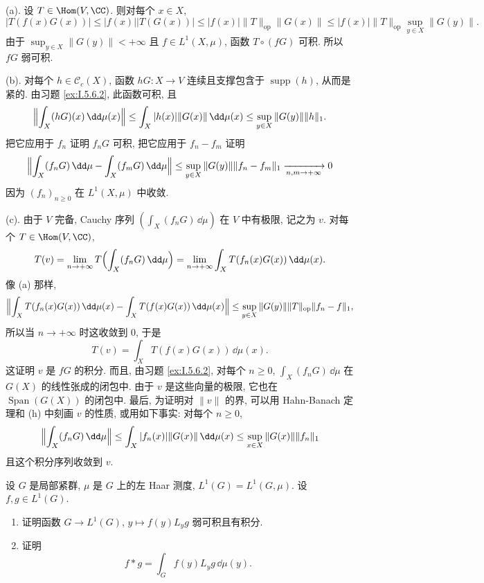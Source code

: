 \begin{solution}
(a). 设 $T \in \Hom(V, \CC)$. 则对每个 $x \in X$,
\[
|T(f(x)G(x))| \leq |f(x)||T(G(x))| \leq |f(x)|\|T\|_{\mathrm{op}}\|G(x)\| \leq |f(x)|\|T\|_{\mathrm{op}}\sup_{y \in X}\|G(y)\|.
\]
由于 $\sup_{y \in X}\|G(y)\| < +\infty$ 且 $f \in L^1(X, \mu)$, 函数 $T \circ (fG)$ 可积. 所以 $fG$ 弱可积.

(b). 对每个 $h \in \mathcal{C}_c(X)$, 函数 $hG \colon X \to V$ 连续且支撑包含于 $\operatorname{supp}(h)$, 从而是紧的. 由习题 \ref{ex:I.5.6.2}, 此函数可积, 且
\[
\Bigl\|\int_X (hG)(x)\,\dd\mu(x)\Bigr\| \leq \int_X |h(x)|\|G(x)\|\,\dd\mu(x) \leq \sup_{y \in X}\|G(y)\|\|h\|_1.
\]
把它应用于 $f_n$ 证明 $f_nG$ 可积, 把它应用于 $f_n - f_m$ 证明
\[
\Bigl\|\int_X (f_nG)\,\dd\mu - \int_X (f_mG)\,\dd\mu\Bigr\| \leq \sup_{y \in X}\|G(y)\|\|f_n - f_m\|_1 \xrightarrow[n,m \to +\infty]{} 0
\]
因为 $(f_n)_{n \geq 0}$ 在 $L^1(X, \mu)$ 中收敛.

(c). 由于 $V$ 完备, Cauchy 序列 $(\int_X (f_nG)\,\dd\mu)$ 在 $V$ 中有极限, 记之为 $v$. 对每个 $T \in \Hom(V, \CC)$,
\[
T(v) = \lim_{n \to +\infty}T\Bigl(\int_X (f_nG)\,\dd\mu\Bigr) = \lim_{n \to +\infty}\int_X T(f_n(x)G(x))\,\dd\mu(x).
\]
像 (a) 那样,
\[
\Bigl\|\int_X T(f_n(x)G(x))\,\dd\mu(x) - \int_X T(f(x)G(x))\,\dd\mu(x)\Bigr\| \leq \sup_{y \in X}\|G(y)\|\|T\|_{\mathrm{op}}\|f_n - f\|_1,
\]
所以当 $n \to +\infty$ 时这收敛到 $0$, 于是
\[
T(v) = \int_X T(f(x)G(x))\,\dd\mu(x).
\]
这证明 $v$ 是 $fG$ 的积分.
而且, 由习题 \ref{ex:I.5.6.2}, 对每个 $n \geq 0$, $\int_X (f_nG)\,\dd\mu$ 在 $G(X)$ 的线性张成的闭包中. 由于 $v$ 是这些向量的极限, 它也在 $\operatorname{Span}(G(X))$ 的闭包中.
最后, 为证明对 $\|v\|$ 的界, 可以用 Hahn-Banach 定理和 (h) 中刻画 $v$ 的性质, 或用如下事实: 对每个 $n \geq 0$,
\[
\Bigl\|\int_X (f_nG)\,\dd\mu\Bigr\| \leq \int_X |f_n(x)|\|G(x)\|\,\dd\mu(x) \leq \sup_{x \in X}\|G(x)\|\|f_n\|_1
\]
且这个积分序列收敛到 $v$.
\end{solution}

\begin{exercise}[卷积的积分公式]
\label{ex:I.5.6.4}
设 $G$ 是局部紧群, $\mu$ 是 $G$ 上的左 Haar 测度, $L^1(G) = L^1(G, \mu)$. 设 $f, g \in L^1(G)$.
\begin{enumerate}
\item[(a)] 证明函数 $G \to L^1(G)$, $y \longmapsto f(y)L_yg$ 弱可积且有积分.
\item[(b)] 证明
\[
f * g = \int_G f(y)L_yg\,\dd\mu(y).
\]
\end{enumerate}
\end{exercise}

